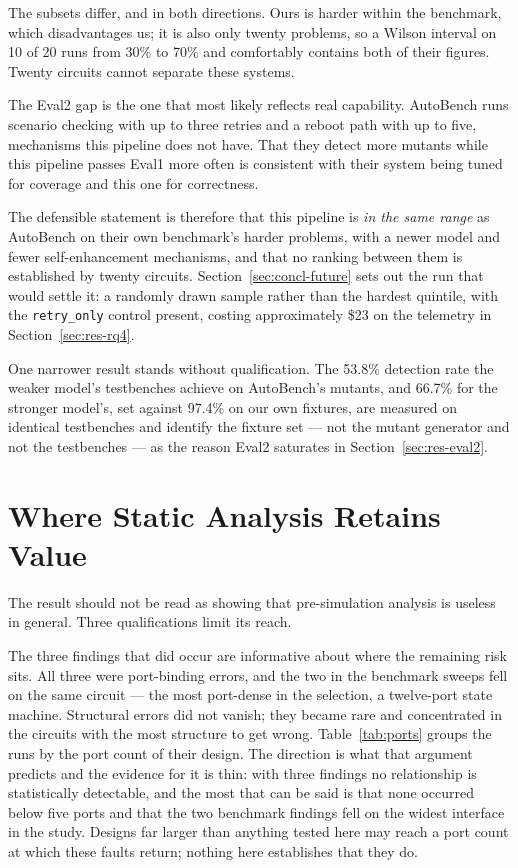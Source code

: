 \documentclass[11pt,a4paper,titlepage=false]{scrreprt}
\begin{document}
The subsets differ, and in both directions. Ours is harder within the benchmark, which
disadvantages us; it is also only twenty problems, so a Wilson interval on 10 of 20 runs from
30\% to 70\% and comfortably contains both of their figures. Twenty circuits cannot separate
these systems.

The Eval2 gap is the one that most likely reflects real capability. AutoBench runs scenario
checking with up to three retries and a reboot path with up to five, mechanisms this pipeline
does not have. That they detect more mutants while this pipeline passes Eval1 more often is
consistent with their system being tuned for coverage and this one for correctness.

The defensible statement is therefore that this pipeline is \emph{in the same range} as
AutoBench on their own benchmark's harder problems, with a newer model and fewer
self-enhancement mechanisms, and that no ranking between them is established by twenty
circuits. Section~\ref{sec:concl-future} sets out the run that would settle it: a randomly
drawn sample rather than the hardest quintile, with the \texttt{retry\_only} control present,
costing approximately \$23 on the telemetry in Section~\ref{sec:res-rq4}.

One narrower result stands without qualification. The 53.8\% detection rate the weaker
model's testbenches achieve on AutoBench's mutants, and 66.7\% for the stronger model's, set
against 97.4\% on our own fixtures, are measured on identical testbenches and identify the
fixture set --- not the mutant generator and not the testbenches --- as the reason Eval2
saturates in Section~\ref{sec:res-eval2}.

\section{Where Static Analysis Retains Value}\label{sec:disc-value}

The result should not be read as showing that pre-simulation analysis is useless in general.
Three qualifications limit its reach.

The three findings that did occur are informative about where the remaining risk sits. All
three were port-binding errors, and the two in the benchmark sweeps fell on the same circuit
--- the most port-dense in the selection, a twelve-port state machine. Structural errors did not vanish;
they became rare and concentrated in the circuits with the most structure to get wrong.
Table~\ref{tab:ports} groups the runs by the port count of their design. The direction is what
that argument predicts and the evidence for it is thin: with three findings no relationship is
statistically detectable, and the most that can be said is that none occurred below five ports
and that the two benchmark findings fell on the widest interface in the study. Designs far
larger than anything tested here may reach a port count at which these faults return; nothing
here establishes that they do.
\end{document}
